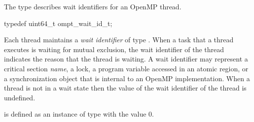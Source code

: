 \label{sec:ompt_wait_id_t}

\summary
The  type describes wait identifiers for an OpenMP thread.

\format
\begin{ccppspecific}
\begin{omptOther}
typedef uint64_t ompt_wait_id_t;
\end{omptOther}
\end{ccppspecific}

\descr
Each thread maintains a \emph{wait identifier} of type . 
When a task that a thread executes is waiting for mutual exclusion, the wait 
identifier of the thread indicates the reason that the thread is waiting. A 
wait identifier may represent a critical section {\em name}, a lock, a program 
variable accessed in an atomic region, or a synchronization object that is 
internal to an OpenMP implementation. When a thread is not in a wait state
then the value of the wait identifier of the thread is undefined.

 is defined as an instance of type 
 with the value 0.

